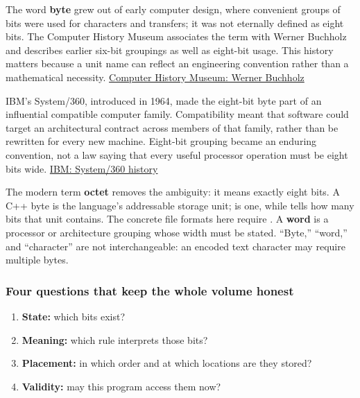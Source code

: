 The word \textbf{byte} grew out of early computer design, where convenient groups of bits were used for characters and transfers; it was not eternally defined as eight bits. The Computer History Museum associates the term with Werner Buchholz and describes earlier six-bit groupings as well as eight-bit usage. This history matters because a unit name can reflect an engineering convention rather than a mathematical necessity. \href{https://www.computerhistory.org/tdih/october/24/}{Computer History Museum: Werner Buchholz}

IBM's System/360, introduced in 1964, made the eight-bit byte part of an influential compatible computer family. Compatibility meant that software could target an architectural contract across members of that family, rather than be rewritten for every new machine. Eight-bit grouping became an enduring convention, not a law saying that every useful processor operation must be eight bits wide. \href{https://www.ibm.com/history/system-360}{IBM: System/360 history}

The modern term \textbf{octet} removes the ambiguity: it means exactly eight bits. A C++ byte is the language's addressable storage unit;  is one, while  tells how many bits that unit contains. The concrete file formats here require . A \textbf{word} is a processor or architecture grouping whose width must be stated. ``Byte,'' ``word,'' and ``character'' are not interchangeable: an encoded text character may require multiple bytes.

\subsubsection{Four questions that keep the whole volume honest}\label{01-foundations-i-ch001-four-questions-that-keep-the-whole-volume-honest}

\hypertarget{01-foundations-i-ch001-four-questions-that-keep-the-whole-volume-honest}{}

\begin{enumerate}
\def\labelenumi{\arabic{enumi}.}
\tightlist
\item
  \textbf{State:} which bits exist?
\item
  \textbf{Meaning:} which rule interprets those bits?
\item
  \textbf{Placement:} in which order and at which locations are they stored?
\item
  \textbf{Validity:} may this program access them now?
\end{enumerate}

